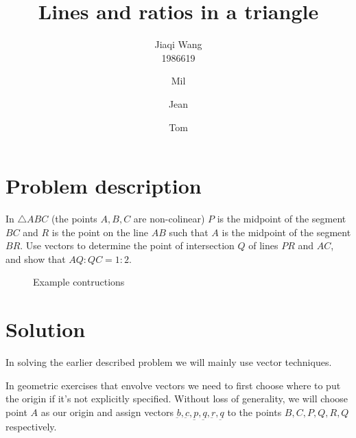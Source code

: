 \documentclass{article}
\title{Lines and ratios in a triangle}
\author{Jiaqi Wang \\ 1986619
\and Mil
\and Jean
\and Tom}
\renewcommand{\v}[1]{\underbar{#1}}
\theoremstyle{mytheoremstyle}
\theoremstyle{mytheoremstyle}
\theoremstyle{myproblemstyle}
\begin{document}
    \maketitle
    \newpage
    \section{Problem description}
    In $ \triangle ABC$ (the points $A,B,C$ are non-colinear)
    $P$ is the midpoint of the segment $BC$ and
    $R$ is the point on the line $AB$ such that $A$
    is the midpoint of the segment $BR$. Use vectors to determine the point of intersection
    $Q$ of lines $PR$ and $AC$, and show that $AQ:QC = 1:2$.

    \begin{figure}[h]
        \begin{center}
        \end{center}
        \caption{Example contructions}
    \end{figure}

    
    \section{Solution}
    In solving the earlier described problem we will mainly use vector techniques. 
    \par
    In geometric exercises that envolve vectors we need to first choose where to put the origin
    if it's not explicitly specified. Without loss of generality, we will choose point $A$ as our origin and assign vectors
    $\v{b}, \v{c}, \v{p}, \v{q}, \v{r}, \v{q}$ to the points
    $B, C, P, Q, R, Q$ respectively.
\end{document}

